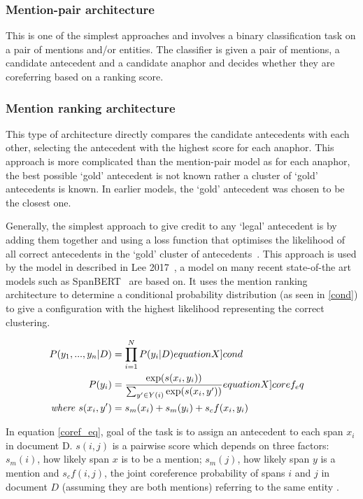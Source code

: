 \subsubsection{Mention-pair architecture} 
This is one of the simplest approaches and involves a binary classification task on a pair of mentions and/or entities. The classifier is given a pair of mentions, a candidate antecedent and a candidate anaphor and decides whether they are coreferring based on a ranking score. 

\subsubsection{Mention ranking architecture}

This type of architecture directly compares the candidate antecedents with each other,  selecting the antecedent with the highest score for each anaphor. This approach is more complicated than the mention-pair model as for each anaphor, the best possible `gold' antecedent is not known rather a cluster of `gold' antecedents is known. In earlier models, the `gold' antecedent was chosen to be the closest one. 

Generally, the simplest approach to give credit to any `legal' antecedent is by adding them together and using a loss function that optimises the likelihood of all correct antecedents in the `gold' cluster of antecedents~\cite{stanfordcoref}. This approach is used by the model in described in Lee 2017~\cite{lee2017end}, a model on many recent state-of-the art models such as SpanBERT~\cite{spanBERT} are based on. It uses the mention ranking architecture to determine a conditional probability distribution (as seen in \cref{cond}) to give a configuration with the highest likelihood representing the correct clustering. 

\begin{align}
 P(y_1, ..., y_n | D)  &= \prod_{i=1}^{N} P(y_i | D) \label[equationX]{cond} &\\
 P(y_i) &= \frac{\exp(s(x_i, y_i))}{\sum_{y' \in Y(i)} \exp(s(x_i,y'))}  \label[equationX]{coref_eq} &\\
\mathit{where} \ s(x_i,y')  &= s_m (x_i) +  s_m (y_i)  +  s_cf(x_i, y_i) \nonumber
\end{align}

In equation \cref{coref_eq}, goal of the task is to assign an antecedent to each span $x_i$ in document D. \( s(i,j)\) is a pairwise score which depends on three factors:  \(s_m(i)\), how likely span $x$ is to be a mention; \(s_m(j)\), how likely span $y$ is a mention and \(s_cf(i, j)\), the joint coreference probability of spans $i$ and $j$  in document $D$ (assuming they are both mentions) referring to the same entity \cite{lee2017end}\cite{lee2018coursetofine}.
